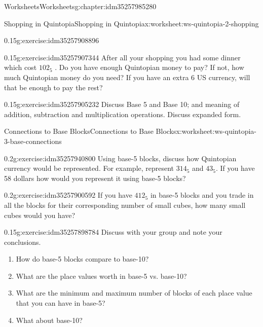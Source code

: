 \documentclass[twoside,11pt,]{book}
\begin{document}
\begin{chapterptx}{Worksheets}{}{Worksheets}{}{}{g:chapter:idm35257985280}
\begin{worksheet-section-numberless}{Shopping in Quintopia}{}{Shopping in Quintopia}{}{}{x:worksheet:ws-quintopia-2-shopping}
\begin{divisionexercise}{4}{}{0.15}{g:exercise:idm35257908896}
\end{divisionexercise}%
\begin{divisionexercise}{5}{}{0.15}{g:exercise:idm35257907344}%
After all your shopping you had some dinner which cost \(102_{5}\) . Do you have enough Quintopian money to pay? If not, how much Quintopian money do you need?  If you have an extra \textdollar{}6 US currency, will that be enough to pay the rest?%
\end{divisionexercise}%
\begin{divisionexercise}{6}{}{0.15}{g:exercise:idm35257905232}%
Discuss Base 5 and Base 10; and meaning of addition, subtraction and multiplication operations. Discuss expanded form.%
\end{divisionexercise}%
\end{worksheet-section-numberless}
\restoregeometry
%
%
\typeout{************************************************}
\typeout{************************************************}
%
\begin{worksheet-section-numberless}{Connections to Base Blocks}{}{Connections to Base Blocks}{}{}{x:worksheet:ws-quintopia-3-base-connections}
\begin{divisionexercise}{1}{}{0.2}{g:exercise:idm35257940800}%
Using base-5 blocks, discuss how Quintopian currency would be represented. For example, represent \(314_{5}\) and \(43_{5}\). If you have \textdollar{}58 dollars how would you represent it using base-5 blocks?%
\end{divisionexercise}%
\begin{divisionexercise}{2}{}{0.2}{g:exercise:idm35257900592}%
If you have \(412_{5}\) in base-5 blocks and you trade in all the blocks for their corresponding number of small cubes, how many small cubes would you have?%
\end{divisionexercise}%
\begin{divisionexercise}{3}{}{0.15}{g:exercise:idm35257898784}%
Discuss with your group and note your conclusions.%
%
\begin{enumerate}[label=(\alph*)]
\item{}How do base-5 blocks compare to base-10?%
\item{}What are the place values worth in base-5 vs. base-10?%
\item{}What are the minimum and maximum number of blocks of each place value that you can have in base-5?%
\item{}What about base-10?%

\end{enumerate}
\end{divisionexercise}
\end{worksheet-section-numberless}
\end{chapterptx}
\end{document}
